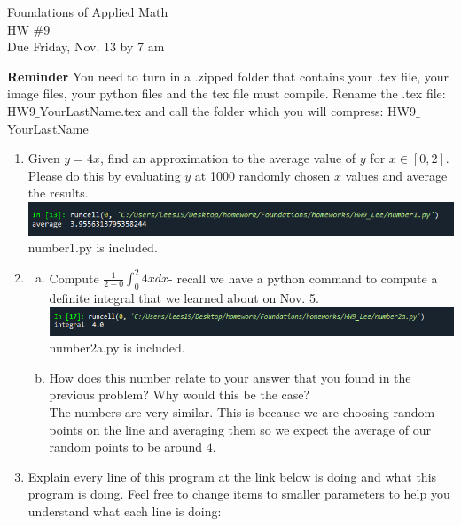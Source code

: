 \documentclass[10pt,letterpaper]{article}
\begin{document}
Foundations of Applied Math\\
 HW \#9\\
 Due Friday, Nov. 13 by 7 am
 
\textbf{Reminder} You need to turn in a .zipped folder that contains your .tex file, your image files, your python files  and the tex file must compile.
Rename the .tex file: HW9$\_$YourLastName.tex and call the folder which you will compress: HW9$\_$YourLastName


\begin{enumerate}

\item Given $y=4x$, find an approximation to the average value of $y$ for $x \in [0,2]$.
Please do this by evaluating $y$ at 1000 randomly chosen $x$ values and average the results.\\
\includegraphics[scale = .8]{number1.png}\\
number1.py is included.

\item 
\begin{enumerate}[a)]
\item 
Compute $\frac{1}{2-0}\int_0^2 4x dx$- recall we have a python command to compute a definite integral that we learned about on Nov. 5.
\\
\includegraphics[scale = .8]{number2a.png}\\
number2a.py is included.
\item How does this number relate to your answer that you found in the previous problem? Why would this be the case?
\\
The numbers are very similar. This is because we are choosing random points on the line 
and averaging them so we expect the average of our random points to be around $4$. 

\end{enumerate}
\item Explain every line of this program  at the link below is doing and what this program is doing. Feel free to change items to smaller parameters to help you understand what each line is doing:


\end{enumerate}
\end{document}

